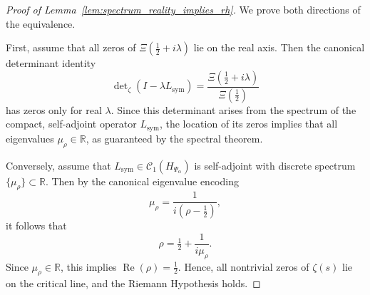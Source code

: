 \begin{proof}[Proof of Lemma~\ref{lem:spectrum_reality_implies_rh}]
We prove both directions of the equivalence.

First, assume that all zeros of \( \Xi(\tfrac{1}{2} + i\lambda) \) lie on the real axis. Then the canonical determinant identity
\[
\det\nolimits_\zeta(I - \lambda L_{\mathrm{sym}}) = \frac{\Xi(\tfrac{1}{2} + i\lambda)}{\Xi(\tfrac{1}{2})}
\]
has zeros only for real \( \lambda \). Since this determinant arises from the spectrum of the compact, self-adjoint operator \( L_{\mathrm{sym}} \), the location of its zeros implies that all eigenvalues \( \mu_\rho \in \mathbb{R} \), as guaranteed by the spectral theorem.

Conversely, assume that \( L_{\mathrm{sym}} \in \mathcal{C}_1(H_{\Psi_\alpha}) \) is self-adjoint with discrete spectrum \( \{\mu_\rho\} \subset \mathbb{R} \). Then by the canonical eigenvalue encoding
\[
\mu_\rho = \frac{1}{i(\rho - \tfrac{1}{2})},
\]
it follows that
\[
\rho = \tfrac{1}{2} + \frac{1}{i\mu_\rho}.
\]
Since \( \mu_\rho \in \mathbb{R} \), this implies \( \operatorname{Re}(\rho) = \tfrac{1}{2} \). Hence, all nontrivial zeros of \( \zeta(s) \) lie on the critical line, and the Riemann Hypothesis holds.
\end{proof}
%  